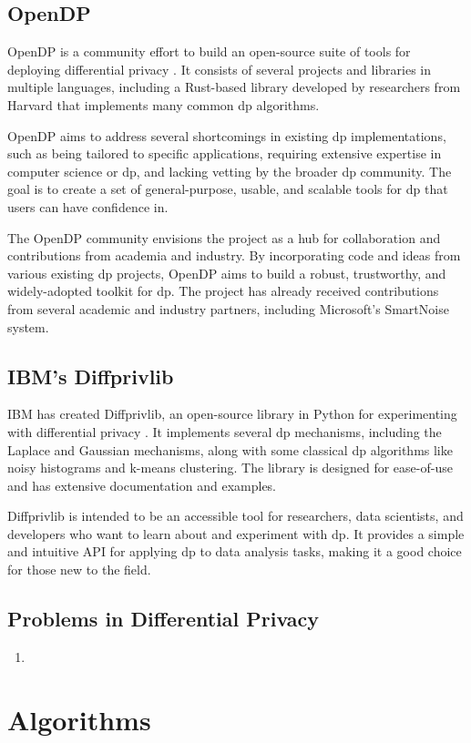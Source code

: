 \subsection{OpenDP}

OpenDP is a community effort to build an open-source suite of tools for deploying differential privacy \cite{opendp2020, Vadhan2019OpenDPA}. It consists of several projects and libraries in multiple languages, including a Rust-based library developed by researchers from Harvard that implements many common \acrshort{dp} algorithms.

OpenDP aims to address several shortcomings in existing \acrshort{dp} implementations, such as being tailored to specific applications, requiring extensive expertise in computer science or \acrshort{dp}, and lacking vetting by the broader \acrshort{dp} community. The goal is to create a set of general-purpose, usable, and scalable tools for \acrshort{dp} that users can have confidence in.

The OpenDP community envisions the project as a hub for collaboration and contributions from academia and industry. By incorporating code and ideas from various existing \acrshort{dp} projects, OpenDP aims to build a robust, trustworthy, and widely-adopted toolkit for \acrshort{dp}. The project has already received contributions from several academic and industry partners, including Microsoft's SmartNoise system.

\subsection{IBM's Diffprivlib}

IBM has created Diffprivlib, an open-source library in Python for experimenting with differential privacy \cite{holohan2019diffprivlib}. It implements several \acrshort{dp} mechanisms, including the Laplace and Gaussian mechanisms, along with some classical \acrshort{dp} algorithms like noisy histograms and k-means clustering. The library is designed for ease-of-use and has extensive documentation and examples.

Diffprivlib is intended to be an accessible tool for researchers, data scientists, and developers who want to learn about and experiment with \acrshort{dp}. It provides a simple and intuitive API for applying \acrshort{dp} to data analysis tasks, making it a good choice for those new to the field.


\subsection{Problems in Differential Privacy}
\begin{enumerate}
    \item 
\end{enumerate}

\section{Algorithms}

